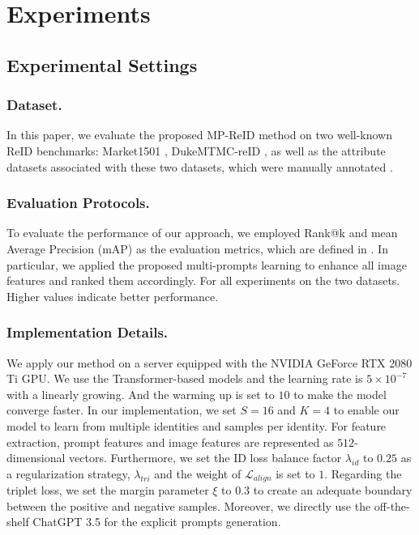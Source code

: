 \documentclass[letterpaper]{article} %
\begin{document}
\section{Experiments}

\subsection{Experimental Settings}\label{expd}

\subsubsection{\textbf{Dataset.}} In this paper, we evaluate the proposed MP-ReID method on two well-known ReID benchmarks: Market1501 \cite{zheng2015scalable}, DukeMTMC-reID \cite{zheng2017unlabeled}, as well as the attribute datasets associated with these two datasets, which were manually annotated \cite{lin2019improving}.

\subsubsection{\textbf{Evaluation Protocols.}} To evaluate the performance of our approach, we employed Rank@k and mean Average Precision (mAP) as the evaluation metrics, which are defined in \cite{wang2021beyond,farooq2022axm}. In particular, we applied the proposed multi-prompts learning to enhance all image features and ranked them accordingly. For all experiments on the two datasets. Higher values indicate better performance.
\subsubsection{\textbf{Implementation Details.}} 
We apply our method on a server equipped with the NVIDIA GeForce RTX 2080 Ti GPU. We use the Transformer-based models and the learning rate is $5 \times 10^{-7}$ with a linearly growing. And the warming up is set to $10$ to make the model converge faster. In our implementation, we set $S = 16$ and $K = 4$ to enable our model to learn from multiple identities and samples per identity. For feature extraction, prompt features and image features are represented as $512$-dimensional vectors. Furthermore, we set the ID loss balance factor $\lambda_{id}$ to $0.25$ as a regularization strategy, $\lambda_{tri}$ and the weight of $\mathcal{L}_{align}$ is set to $1$. Regarding the triplet loss, we set the margin parameter $\xi$ to $0.3$ to create an adequate boundary between the positive and negative samples. Moreover, we directly use the off-the-shelf ChatGPT 3.5 for the explicit prompts generation.
\end{document}
